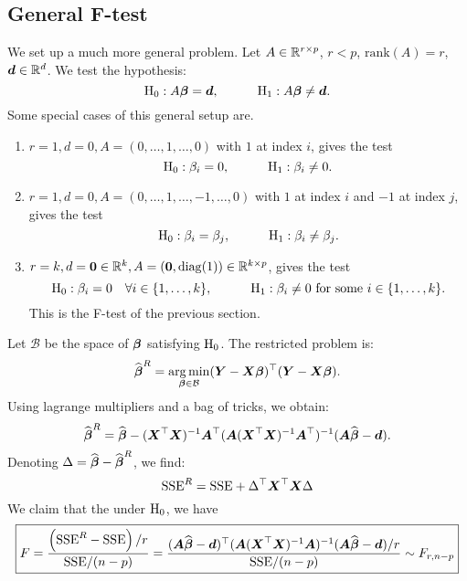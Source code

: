 \subsection{General F-test}
We set up a much more general problem. Let $A\in\mathbb{R}^{r\times p}$, $r<p$, $\mathrm{rank}(A)=r$, $\boldsymbol{d}\in\mathbb{R}^d$. We test the hypothesis:
$$
    \mathrm{H}_0 : A\boldsymbol{\beta} = \boldsymbol{d}, 
    \quad\quad\quad
    \mathrm{H}_1 : A\boldsymbol{\beta} \ne \boldsymbol{d}.
$$
Some special cases of this general setup are.
\begin{enumerate}[label=\textbullet]
    \item $r=1, d=0, A=(0, \dots, 1, \dots, 0)$ with $1$ at index $i$, gives the test 
    $$
        \mathrm{H}_0 : \beta_i = 0, 
        \quad\quad\quad
        \mathrm{H}_1 : \beta_i \ne 0.
    $$
    \item $r=1, d=0, A=(0, \dots, 1, \dots, -1, \dots, 0)$ with $1$ at index $i$ and $-1$ at index $j$, gives the test 
    $$
        \mathrm{H}_0 : \beta_i = \beta_j,
        \quad\quad\quad
        \mathrm{H}_1 : \beta_i \ne \beta_j.
    $$
    \item $r=k, d=\boldsymbol{0}\in\mathbb{R}^k, A=(\boldsymbol{0}, \mathrm{diag}(1))\in\mathbb{R}^{k\times p}$, gives the test 
    $$
        \mathrm{H}_0 : \beta_i = 0 \quad\forall i\in\{1,\dots,k\},
        \quad\quad\quad
        \mathrm{H}_1 : \beta_i \ne 0 \textrm{ for some } i\in\{1,\dots,k\}.
    $$
    This is the F-test of the previous section.
\end{enumerate}
Let $\mathcal{B}$ be the space of $\boldsymbol{\beta}$ satisfying $\mathrm{H}_0$. The restricted problem is:
$$
    \widehat{\boldsymbol{\beta}}^R = \operatorname*{arg\,min}_{\boldsymbol{\beta}\in\mathcal{B}}(\boldsymbol{Y}-\boldsymbol{X}\boldsymbol{\beta})^\top(\boldsymbol{Y}-\boldsymbol{X}\boldsymbol{\beta}).
$$
Using lagrange multipliers and a bag of tricks, we obtain:
$$
    \widehat{\boldsymbol{\beta}}^R = \widehat{\boldsymbol{\beta}} - (\boldsymbol{X}^\top\boldsymbol{X})^{-1}\boldsymbol{A}^\top(\boldsymbol{A}(\boldsymbol{X}^\top\boldsymbol{X})^{-1}\boldsymbol{A}^\top)^{-1}(\boldsymbol{A}\widehat{\boldsymbol{\beta}}-\boldsymbol{d}).
$$
Denoting $\Delta = \widehat{\boldsymbol{\beta}}-\widehat{\boldsymbol{\beta}}^R$, we find:
$$
    \mathrm{SSE}^R = \mathrm{SSE} + \Delta^\top\boldsymbol{X}^\top\boldsymbol{X}\Delta
$$
We claim that the under $\mathrm{H}_0$, we have
\begin{equation}
    \boxed{F 
    = \frac{\left( \mathrm{SSE}^R-\mathrm{SSE} \right) / r}{\mathrm{SSE}/(n-p)} 
    = \frac{(\boldsymbol{A}\widehat{\boldsymbol{\beta}}-\boldsymbol{d})^\top(\boldsymbol{A}(\boldsymbol{X}^\top\boldsymbol{X})^{-1}\boldsymbol{A})^{-1}(\boldsymbol{A}\widehat{\boldsymbol{\beta}}-\boldsymbol{d}) / r}{\mathrm{SSE}/(n-p)} 
    \sim F_{r, n-p}}    
\end{equation}

